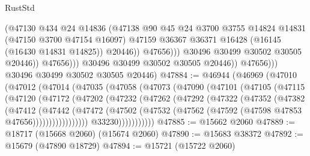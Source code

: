 \begin{lexlean}{RustStd}
\begin{coremodule}
                                (@47130
                                  @434
                                  @24
                                  @14836
                                  (@47138
                                    @90
                                    @45
                                    @24
                                    @3700
                                    @3755
                                    @14824
                                    @14831
                                    (@47150 @3700 @47154 @16097)
                                    @47159
                                    @36367
                                    @36371
                                    @16428
                                    (@16145 (@16430 @14831 @14825))
                                    @20446))
                                @47656)))
                          @30496
                          @30499
                          @30502
                          @30505
                          @20446))
                      @47656)))
                @30496
                @30499
                @30502
                @30505
                @20446))
            @47656)))
      @30496
      @30499
      @30502
      @30505
      @20446)
@47884 := @46944
    (@46969
      (@47010
        (@47012
          (@47014
            (@47035
              (@47058
                (@47073
                  (@47090
                    (@47101
                      (@47105
                        (@47115
                          (@47120
                            (@47172
                              (@47202
                                (@47232
                                  (@47262
                                    (@47292
                                      (@47322
                                        (@47352
                                          (@47382
                                            (@47412
                                              (@47442
                                                (@47472
                                                  (@47502
                                                    (@47532
                                                      (@47562
                                                        (@47592
                                                          (@47598 @47853 @47656)))))))))))))))))
                          @33230)))))))))))
@47885 := @15662 @2060
@47889 := @18717 (@15668 @2060) (@15674 @2060)
@47890 := @15683 @38372
@47892 := @15679 (@47890 @18729)
@47894 := @15721 (@15722 @2060)

\end{coremodule}
\end{lexlean}
